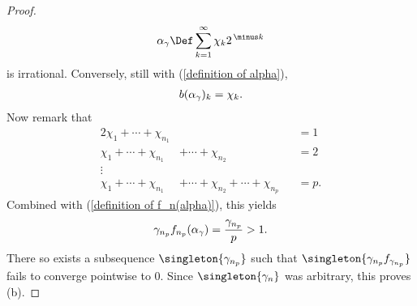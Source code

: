 \begin{proof}
%
  \begin{align}
    \xgamma 
      \Def
    \sum_{k=1}^\infty \chi_k 2^{\, \minus k}
  \end{align}
%
is irrational. Conversely, still with (\ref{definition of alpha}),  %
%
  \begin{align}
    b(\alpha_{\gamma})_{k} = \chi_{k}.
  \end{align}
%
Now remark that %
%
  \begin{alignat}{2}
    \chi_1 + \cdots + \chi_{n_{1}} & &&=1 \\
    \chi_1 + \cdots + \chi_{n_{1}} & + \cdots + \chi_{n_{2}} &&=2 \\
    \nonumber \vdots&  &&\\
    \chi_1 + \cdots + \chi_{n_{1}} & + \cdots + \chi_{n_{2}} + \cdots + 
    \chi_{n_{p}}&&=p.
  \end{alignat}
%
Combined with (\ref{definition of f_n(alpha)}), this yields %
%
  \begin{align}
    \gamma_{n_p} f_{n_{p}}(\alpha_{\gamma}) = \frac{\gamma_{n_p}}{p} > 1.
  \end{align}
%
There so exists a subsequence $\singleton{\gamma_{n_p}}$ such that %
%
  $\singleton{\gamma_{n_p} f_{\gamma_{n_p}}}$ %
%
fails to converge pointwise to $0$. %
Since $\singleton{\gamma_{n}}$ was arbitrary, this proves (b).
\end{proof}
